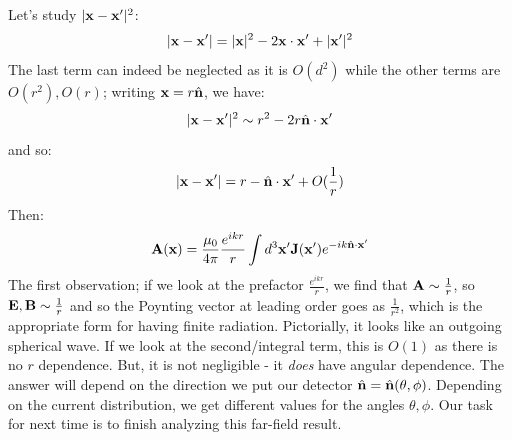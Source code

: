 Let's study $\lvert \mathbf{x} - \mathbf{x}' \rvert^2$:
\begin{equation}
    \lvert \mathbf{x} - \mathbf{x}' \rvert = \lvert \mathbf{x} \rvert^2 - 2\mathbf{x} \cdot \mathbf{x}' + \lvert \mathbf{x}' \rvert^2
\end{equation}
The last term can indeed be neglected as it is $O(d^2)$ while the other terms are $O(r^2), O(r)$; writing $\mathbf{x} = r\hat{\mathbf{n}}$, we have:
\begin{equation}
    \lvert \mathbf{x} - \mathbf{x}' \rvert^2 \sim r^2 - 2r\hat{\mathbf{n}} \cdot \mathbf{x}' 
\end{equation}
and so:
\begin{equation}
    \lvert \mathbf{x} - \mathbf{x}' \rvert = r - \hat{\mathbf{n}} \cdot \mathbf{x}' + O(\frac{1}{r})
\end{equation}
Then:
\begin{equation}
    \mathbf{A}(\mathbf{x}) = \frac{\mu_0}{4\pi}\frac{e^{ikr}}{r}\int d^3\mathbf{x}' \mathbf{J}(\mathbf{x'})e^{-ik\hat{\mathbf{n}}\cdot\mathbf{x}'}
\end{equation}
The first observation; if we look at the prefactor $\frac{e^{ikr}}{r}$, we find that $\mathbf{A} \sim \frac{1}{r}$, so $\mathbf{E}, \mathbf{B} \sim \frac{1}{r}$ and so the Poynting vector at leading order goes as $\frac{1}{r^2}$, which is the appropriate form for having finite radiation. Pictorially, it looks like an outgoing spherical wave. If we look at the second/integral term, this is $O(1)$ as there is no $r$ dependence. But, it is not negligible - it \emph{does} have angular dependence. The answer will depend on the direction we put our detector $\hat{\mathbf{n}} = \hat{\mathbf{n}}(\theta, \phi)$. Depending on the current distribution, we get different values for the angles $\theta, \phi$. Our task for next time is to finish analyzing this far-field result.